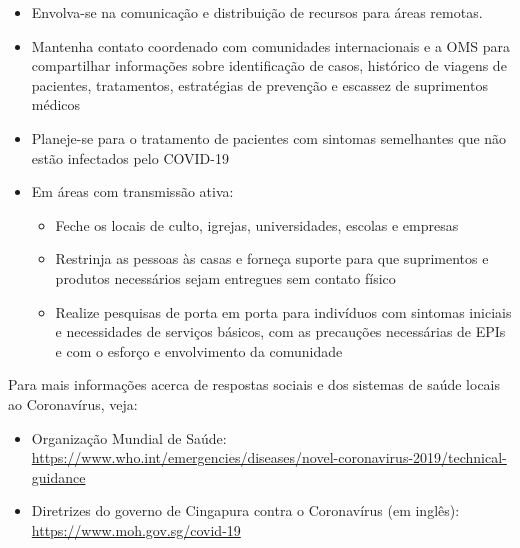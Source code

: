 \documentclass[onecolumn,journal]{IEEEtran}
\begin{document}
\begin{multicols}{2}
\begin{itemize}
\item Envolva-se na comunicação e distribuição de recursos para áreas remotas.
\item Mantenha contato coordenado com comunidades internacionais e a OMS para compartilhar informações sobre identificação de casos, histórico de viagens de pacientes, tratamentos, estratégias de prevenção e escassez de suprimentos médicos
\item Planeje-se para o tratamento de pacientes com sintomas semelhantes que não estão infectados pelo COVID-19
\item Em áreas com transmissão ativa:
  \begin{itemize}
  \item Feche os locais de culto, igrejas, universidades, escolas e empresas
  \item Restrinja as pessoas às casas e forneça suporte para que suprimentos e produtos necessários sejam entregues sem contato físico
  \item Realize pesquisas de porta em porta para indivíduos com sintomas iniciais e necessidades de serviços básicos, com as precauções necessárias de EPIs e com o esforço e envolvimento da comunidade
  \end{itemize}
\end{itemize}

\end{multicols}

\vspace{2ex}
Para mais informações acerca de respostas sociais e dos sistemas de saúde locais ao Coronavírus, veja:
\begin{itemize}
\item Organização Mundial de Saúde: \url{https://www.who.int/emergencies/diseases/novel-coronavirus-2019/technical-guidance}
\item Diretrizes do governo de Cingapura contra o Coronavírus (em inglês): \url{https://www.moh.gov.sg/covid-19}
\end{itemize}






% 

\end{document}
